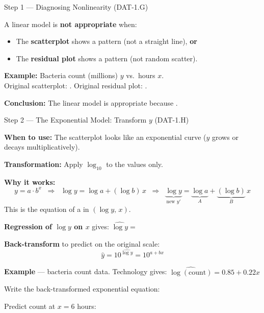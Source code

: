 \documentclass[10pt]{article}
\begin{document}
\begin{notesbox}{Step 1 --- Diagnosing Nonlinearity (DAT-1.G)}
\small

\noindent A linear model is \textbf{not appropriate} when:
\begin{itemize}[itemsep=2pt]
  \item The \textbf{scatterplot} shows a \blank{4cm} pattern (not a straight line), \textbf{or}
  \item The \textbf{residual plot} shows a \blank{4cm} pattern (not random scatter).
\end{itemize}

\vspace{6pt}
\textbf{Example:} Bacteria count (millions) $y$ vs.\ hours $x$. \\[4pt]
\noindent Original scatterplot: \blank{5cm}. \quad Original residual plot: \blank{5cm}.

\vspace{6pt}
\textbf{Conclusion:} The linear model is \blank{3cm} appropriate because \blank{6cm}.

\end{notesbox}

\vspace{0.1in}

\begin{notesbox}{Step 2 --- The Exponential Model: Transform $y$ (DAT-1.H)}
\small

\noindent \textbf{When to use:} The scatterplot looks like an exponential curve
($y$ grows or decays multiplicatively).

\vspace{6pt}
\textbf{Transformation:} Apply $\log_{10}$ to the \blank{2cm} values only.

\vspace{4pt}
\textbf{Why it works:}
\[
  y = a \cdot b^x
  \;\;\Longrightarrow\;\;
  \log y = \log a + (\log b)\,x
  \;\;\Longrightarrow\;\;
  \underbrace{\log y}_{\text{new } y'} = \underbrace{\log a}_{A} + \underbrace{(\log b)}_{B}\,x
\]
This is the equation of a \blank{6cm} in $(\log y,\, x)$.

\vspace{8pt}
\textbf{Regression of $\log y$ on $x$} gives: \quad $\widehat{\log y} = $ \blank{6cm}

\vspace{6pt}
\textbf{Back-transform} to predict on the original scale:
\[
  \hat{y} = 10^{\widehat{\log y}} = 10^{a + bx}
\]

\vspace{6pt}
\textbf{Example} --- bacteria count data. Technology gives: $\widehat{\log(\text{count})} = 0.85 + 0.22x$

\vspace{4pt}
Write the back-transformed exponential equation: \blank{7cm}

\vspace{4pt}
Predict count at $x = 6$ hours: \blank{7cm}

\end{notesbox}
\end{document}
